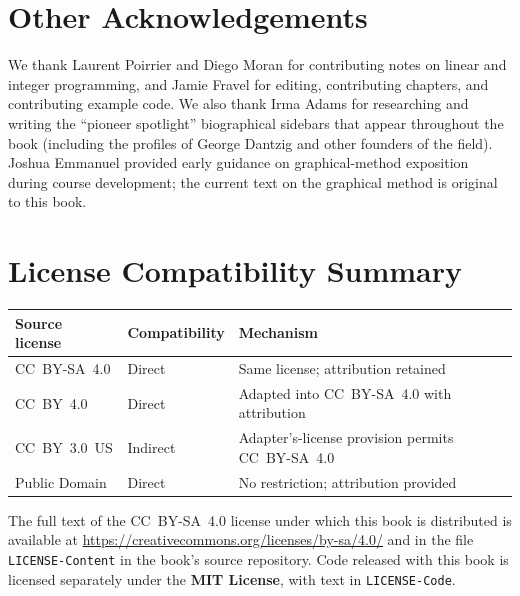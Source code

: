 \section*{Other Acknowledgements}

We thank Laurent Poirrier and Diego Moran for contributing notes on
linear and integer programming, and Jamie Fravel for editing,
contributing chapters, and contributing example code. We also thank
Irma Adams for researching and writing the ``pioneer spotlight''
biographical sidebars that appear throughout the book (including the
profiles of George Dantzig and other founders of the field). Joshua
Emmanuel provided early guidance on graphical-method exposition during
course development; the current text on the graphical method is
original to this book.

\section*{License Compatibility Summary}

\begin{center}
\renewcommand{\arraystretch}{1.25}
\begin{tabular}{l l l}
\toprule
\textbf{Source license} & \textbf{Compatibility} & \textbf{Mechanism} \\
\midrule
CC~BY-SA~4.0 & Direct & Same license; attribution retained \\
CC~BY~4.0    & Direct & Adapted into CC~BY-SA~4.0 with attribution \\
CC~BY~3.0~US & Indirect & Adapter's-license provision permits CC~BY-SA~4.0 \\
Public Domain & Direct & No restriction; attribution provided \\
\bottomrule
\end{tabular}
\end{center}

\noindent The full text of the CC~BY-SA~4.0 license under which this
book is distributed is available at \url{https://creativecommons.org/licenses/by-sa/4.0/}
and in the file \texttt{LICENSE-Content} in the book's source repository.
Code released with this book is licensed separately under the
\textbf{MIT License}, with text in \texttt{LICENSE-Code}.

\cleardoublepage
